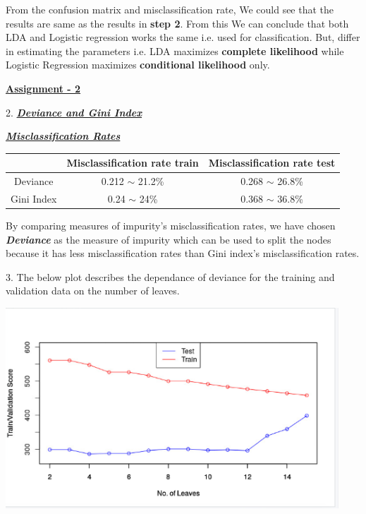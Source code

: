 \documentclass[a4paper,10pt]{article}
\begin{document}
  From the confusion matrix and misclassification rate, We could see that the results are 
  same as the results in \textbf{step 2}. From this We can conclude that both LDA and Logistic regression works the same i.e. used for classification.
  But, differ in estimating the parameters i.e. LDA maximizes \textbf{complete likelihood} while Logistic Regression maximizes \textbf{conditional likelihood} only. \par
\newpage
\textbf{\underline{Assignment - 2}} \par
2. \textbf{\textit{\underline{Deviance and Gini Index}}} \par
\vspace{0.5cm}
\textbf{\textit{\underline{Misclassification Rates}}}
\begin{center}
  \begin{tabular}{|c|c|c|}
    \hline
    & Misclassification rate train & Misclassification rate test\\
    \hline
    Deviance &0.212 $\sim$ 21.2\% & 0.268 $\sim$ 26.8\% \\
    \hline
    Gini Index &0.24 $\sim$ 24\% & 0.368 $\sim$ 36.8\%\\
    \hline
  \end{tabular}
\end{center}\par
\vspace{0.5cm}
By comparing measures of impurity's misclassification rates, we have chosen \textbf{\textit{Deviance}}
as the measure of impurity which can be used to split the nodes because it has less misclassification 
rates than Gini index's misclassification rates.
\par
3. The below plot describes the dependance of deviance for the training and validation data on the number of leaves. \par
\begin{center}
  \includegraphics[width=125mm,scale=0.10]{Deviance_Dependance_train_validation_plot.png} 
\end{center} \newpage
\end{document}

